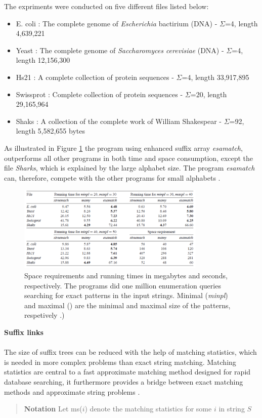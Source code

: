 \documentclass[12pt]{article} %
\begin{document}
The expriments were conducted on five different files listed below:
\begin{itemize} label{FILES}  
\item E. coli : The complete genome of \emph{Escherichia} bactirium (DNA) - $\Sigma$=4, length 4,639,221 
\item Yeast : The complete genome of \emph{Saccharomyces cerevisiae} (DNA) - $\Sigma$=4, length 12,156,300 
\item Hs21 : A complete collection of protein sequences - $\Sigma$=4, length 33,917,895
\item Swissprot : Complete collection of protein sequences - $\Sigma$=20, length 29,165,964
\item Shaks : A collection of the complete work of William Shakespear - $\Sigma$=92, length 5,582,655 bytes
\end{itemize}

As illustrated in Figure \ref{fig:TopDown} the program using enhanced suffix array \emph{esamatch}, outperforms all other programs in both time and space consumption, except the file \emph{Sharks}, which is explained by the large alphabet size. The program \emph{esamatch} can, therefore, compete with the other programs for small alphabets \cite{enchancedsuffix}.

\begin{figure}[H]
    \centering
    \includegraphics[width=0.8\textwidth]{TopDown}
    \captionsetup{width=0.8
    \textwidth}
    \caption{Space requirements and running times in megabytes and seconds, respectively. The programs did one million enumeration queries searching for exact patterns in the input strings. Minimal (\emph{minpl}) and maximal () are the minimal and maximal size of the patterns, respetively \cite{enchancedsuffix}.)}
    \label{fig:TopDown}
    
\end{figure}
\textbf{Suffix links}
\\ \\
The size of suffix trees can be reduced with the help of matching statistics, which is needed in more complex problems than exact string matching. Matching statistics are central to a fast approximate matching method designed for rapid database searching, it furthermore provides a bridge between exact matching methods and approximate string problems \cite{gusfield}.
\begin{quote}
\textbf{Notation} 
Let ms($i$) denote the matching statistics for some $i$ in string $S$
\end{quote}
\end{document}
